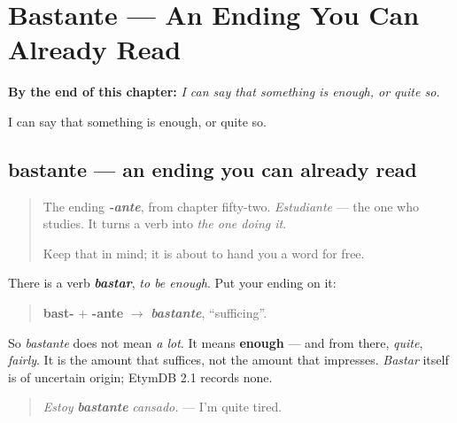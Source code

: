 
\chapter{Bastante --- An Ending You Can Already Read}
\label{ch:bastante}

\begin{chapteropening}
\textbf{By the end of this chapter:} \emph{I can say that something is enough, or quite so.}

I can say that something is enough, or quite so.
\end{chapteropening}

\section[bastante]{bastante — an ending you can already read}

\label{lesson:ES-C60-bastante}



\begin{quote}
The ending \emph{\textbf{-ante}}, from chapter fifty-two. \emph{Estudiante} — the one who studies. It turns a verb into \emph{the one doing it}.

Keep that in mind; it is about to hand you a word for free.
\end{quote}

\begin{cousinweb}
There is a verb \emph{\textbf{bastar}}, \emph{to be enough}. Put your ending on it:

\begin{quote}
\textbf{bast-} + \textbf{-ante} $\to$ \emph{\textbf{bastante}}, \textquotedblleft{}sufficing\textquotedblright{}.
\end{quote}

So \emph{bastante} does not mean \emph{a lot}. It means \textbf{enough} — and from there, \emph{quite}, \emph{fairly}. It is the amount that suffices, not the amount that impresses. \emph{Bastar} itself is of uncertain origin; EtymDB 2.1 records none.

\begin{quote}
\emph{Estoy} \emph{\textbf{bastante}} \emph{cansado.} — I'm quite tired.
\end{quote}
\end{cousinweb}


